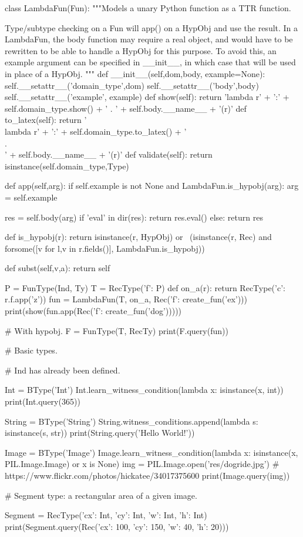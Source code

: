 \begin{cell}
class LambdaFun(Fun):
    """Models a unary Python function as a TTR function.
    
    Type/subtype checking on a Fun will app() on a HypObj and use the result.
    In a LambdaFun, the body function may require a real object,
    and would have to be rewritten to be able to handle a HypObj for this purpose.
    To avoid this, an example argument can be specified in __init__,
    in which case that will be used in place of a HypObj.
    """
    def __init__(self,dom,body, example=None):
        self.__setattr__('domain_type',dom)
        self.__setattr__('body',body)
        self.__setattr__('example', example)
    def show(self):
        return 'lambda r' + ':' + self.domain_type.show() + ' . ' + self.body.__name__ + '(r)'
    def to_latex(self):
        return '\\lambda r' + ':' + self.domain_type.to_latex() + '\\ .\\ ' + self.body.__name__ + '(r)'
    def validate(self):
        return isinstance(self.domain_type,Type)

    def app(self,arg):
        if self.example is not None and LambdaFun.is_hypobj(arg):
            arg = self.example
        
        res = self.body(arg)
        if 'eval' in dir(res):
            return res.eval()
        else:
            return res

    def is_hypobj(r):
        return isinstance(r, HypObj) or \
            (isinstance(r, Rec) and forsome([v for l,v in r.fields()], LambdaFun.is_hypobj))

    def subst(self,v,a):
        return self

P = FunType(Ind, Ty)
T = RecType({'f': P})
def on_a(r):
    return RecType({'c': r.f.app('z')})
fun = LambdaFun(T, on_a, Rec({'f': create_fun('ex')}))
print(show(fun.app(Rec({'f': create_fun('dog')}))))

# With hypobj.
F = FunType(T, RecTy)
print(F.query(fun))
\end{cell}

\begin{cell}
# Basic types.

# Ind has already been defined.

Int = BType('Int')
Int.learn_witness_condition(lambda x: isinstance(x, int))
print(Int.query(365))

String = BType('String')
String.witness_conditions.append(lambda s: isinstance(s, str))
print(String.query('Hello World!'))

Image = BType('Image')
Image.learn_witness_condition(lambda x: isinstance(x, PIL.Image.Image) or x is None)
img = PIL.Image.open('res/dogride.jpg') # https://www.flickr.com/photos/hickatee/34017375600
print(Image.query(img))

# Segment type: a rectangular area of a given image.

Segment = RecType({'cx': Int, 'cy': Int, 'w': Int, 'h': Int})
print(Segment.query(Rec({'cx': 100, 'cy': 150, 'w': 40, 'h': 20})))
\end{cell}

